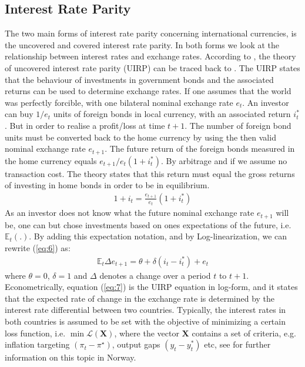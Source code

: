 \documentclass[10pt]{article}
\numberwithin{equation}{section}
\numberwithin{table}{section}
\numberwithin{figure}{section}
\begin{document}
\begin{spacing}{1.5}
\subsection{Interest Rate Parity}
\label{IRP}

\noindent The two main forms of interest rate parity concerning international currencies, is the uncovered and covered interest rate parity. In both forms we look at the relationship between interest rates and exchange rates. According to \cite{dimand1999irving}, the theory of uncovered interest rate parity (UIRP) can be traced back to \cite{fisher1896appreciation}. The UIRP states that the behaviour of investments in government bonds and the associated returns can be used to determine exchange rates. If one assumes that the world was perfectly forcible, with one bilateral nominal exchange rate $e_t$. An investor can buy $1/e_t$ units of foreign bonds in local currency, with an associated return $i_t^*$. But in order to realise a profit/loss at time $t+1$. The number of foreign bond units must be converted back to the home currency by using the then valid nominal exchange rate $e_{t+1}$. The future return of the foreign bonds measured in the home currency equals $e_{t+1}/e_t\left(1+i_{t}^* \right)$. By arbitrage and if we assume no transaction cost. The theory states that this return must equal the gross returns of investing in home bonds in order to be in equilibrium. 
\begin{align}
  1 + i_{t} = \frac{e_{t+1}}{e_t}\left(1+i^*_{t}\right) 
  \label{eq:6}
\end{align}
\noindent As an investor does not know what the future nominal exchange rate $e_{t+1}$ will be, one can but chose investments based on ones expectations of the future, i.e. $\mathbb{E}_t\left(.\right)$. By adding this expectation notation, and by Log-linearization, we can rewrite (\ref{eq:6}) as: 
\begin{align}
    \mathbb{E}_t\Delta e_{t+1} = \theta + \delta \left(i_{t} - i^*_{t} \right) + e_t
    \label{eq:7}
\end{align}
\noindent where $\theta = 0$, $\delta = 1$ and $\Delta$ denotes a change over a period $t$ to $t+1$. Econometrically, equation (\ref{eq:7}) is the UIRP equation in log-form, and it states that the expected rate of change in the exchange rate is determined by the interest rate differential between two countries. Typically, the interest rates in both countries is assumed to be set with the objective of minimizing a certain loss function, i.e. $\min \mathcal{L}\left(\mathbf{X} \right)$, where the vector $\mathbf{X}$ contains a set of criteria, e.g. inflation targeting $\left(\pi_t - \pi^\star \right)$, output gaps $\left(y_t - y_t^*\right)$ etc, see \cite{Norgesbank1} for further information on this topic in Norway.\\

\end{spacing}
\end{document}
